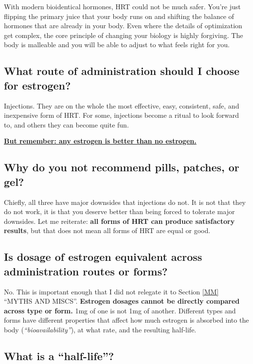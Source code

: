 \documentclass{article}
\begin{document}
With modern bioidentical hormones, HRT could not be much safer. You’re just flipping the primary juice that your body runs on and shifting the balance of hormones that are already in your body. Even where the details of optimization get complex, the core principle of changing your biology is highly forgiving. The body is malleable and you will be able to adjust to what feels right for you.

\subsection{What route of administration should I choose for estrogen?}

Injections. They are on the whole the most effective, easy, consistent, safe, and inexpensive form of HRT. For some, injections become a ritual to look forward to, and others they can become quite fun.

\noindent\underline{\textbf{But remember: any estrogen is better than no estrogen.}}

\subsection{Why do you not recommend pills, patches, or gel?}

Chiefly, all three have major downsides that injections do not. It is not that they do not work, it is that you deserve better than being forced to tolerate major downsides. Let me reiterate: \textbf{all forms of HRT can produce satisfactory results}, but that does not mean all forms of HRT are equal or good.

\subsection{Is dosage of estrogen equivalent across administration routes or forms?}

No. This is important enough that I did not relegate it to Section \ref{MM} “MYTHS AND MISCS”. \textbf{Estrogen dosages cannot be directly compared across type or form.} 1mg of one is not 1mg of another. Different types and forms have different properties that affect how much estrogen is absorbed into the body (\textit{“bioavailability”}), at what rate, and the resulting half-life.

\subsection{What is a “half-life”?}
\end{document}

